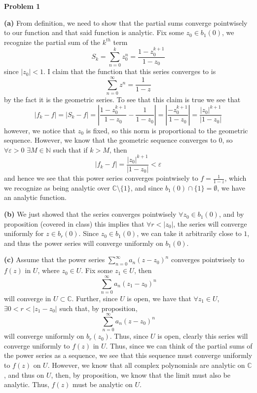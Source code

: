 \documentclass[10pt]{article}
\newcommand{\C}{\mathbb{C}}
\begin{document}
\textbf{Problem 1}

\textbf{(a)}
From definition, we need to show that the partial sums converge pointwisely to our function and that said function is analytic. Fix some $z_{0} \in b_{1}(0)$, we recognize the partial sum of the $k^{th}$ term
$$S_{k} = \sum_{n=0}^{k}z_{0}^{n} = \frac{1 - z_{0}^{k+1}}{1-z_{0}}$$
since $|z_{0}| < 1$. I claim that the function that this series converges to is
$$\sum_{n=0}^{\infty}z^{n} = \frac{1}{1-z}$$
by the fact it is the geometric series. To see that this claim is true we see that
$$|f_{k} - f| = |S_{k} - f| = \left|\frac{1-z_{0}^{k+1}}{1-z_{0}} - \frac{1}{1-z_{0}}\right| = \left|\frac{-z_{0}^{k+1}}{1-z_{0}}\right| = \frac{|z_{0}|^{k+1}}{|1-z_{0}|}$$
however, we notice that $z_{0}$ is fixed, so this norm is proportional to the geometric sequence. However, we know that the geometric sequence converges to 0, so $\forall \varepsilon > 0$ $\exists M \in \mathbb{N}$ such that if $k > M$, then
$$|f_{k} - f| = \frac{|z_{0}|^{k+1}}{|1-z_{0}|} < \varepsilon$$
and hence we see that this power series converges pointwisely to $f = \frac{1}{1-z}$, which we recognize as being analytic over $\C \setminus \{1\}$, and since $b_{1}(0) \cap \{1\} = \emptyset$, we have an analytic function.

\textbf{(b)}
We just showed that the series converges pointwisely $\forall z_{0} \in b_{1}(0)$, and by proposition (covered in class) this implies that $\forall r < |z_{0}|$, the series will converge uniformly for $z \in b_{r}(0)$. Since $z_{0} \in b_{1}(0)$, we can take it arbitrarily close to $1$, and thus the power series will converge uniformly on $b_{1}(0)$.

\textbf{(c)}
Assume that the power series $\sum_{n=0}^{\infty}a_{n}(z-z_{0})^{n}$ converges pointwisely to $f(z)$ in $U$, where $z_{0} \in U$. Fix some $z_{1} \in U$, then
$$\sum_{n=0}^{\infty}a_{n}(z_{1}-z_{0})^{n}$$
will converge in $U \subset \C$. Further, since $U$ is open, we have that $\forall z_{1} \in U$, $\exists 0 < r < |z_{1} - z_{0}|$ such that, by proposition,
$$\sum_{n=0}^{\infty}a_{n}(z-z_{0})^{n}$$
will converge uniformly on $b_{r}(z_{0})$. Thus, since $U$ is open, clearly this series will converge uniformly to $f(z)$ in $U$. Thus, since we can think of the partial sums of the power series as a sequence, we see that this sequence must converge uniformly to $f(z)$ on $U$. However, we know that all complex polynomials are analytic on $\C$, and thus on $U$, then, by proposition, we know that the limit must also be analytic. Thus, $f(z)$ must be analytic on $U$.
\end{document}
